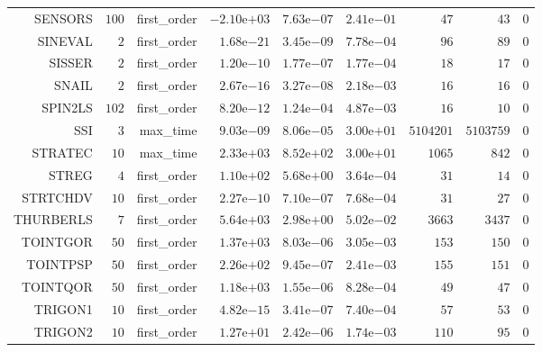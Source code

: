 \begin{longtable}{rrrrrrrrr}
SENSORS & \(   100\) & first\_order & \(-2.10\)e\(+03\) & \( 7.63\)e\(-07\) & \( 2.41\)e\(-01\) & \(    47\) & \(    43\) & \(     0\) \\
SINEVAL & \(     2\) & first\_order & \( 1.68\)e\(-21\) & \( 3.45\)e\(-09\) & \( 7.78\)e\(-04\) & \(    96\) & \(    89\) & \(     0\) \\
SISSER & \(     2\) & first\_order & \( 1.20\)e\(-10\) & \( 1.77\)e\(-07\) & \( 1.77\)e\(-04\) & \(    18\) & \(    17\) & \(     0\) \\
SNAIL & \(     2\) & first\_order & \( 2.67\)e\(-16\) & \( 3.27\)e\(-08\) & \( 2.18\)e\(-03\) & \(    16\) & \(    16\) & \(     0\) \\
SPIN2LS & \(   102\) & first\_order & \( 8.20\)e\(-12\) & \( 1.24\)e\(-04\) & \( 4.87\)e\(-03\) & \(    16\) & \(    10\) & \(     0\) \\
SSI & \(     3\) & max\_time & \( 9.03\)e\(-09\) & \( 8.06\)e\(-05\) & \( 3.00\)e\(+01\) & \(5104201\) & \(5103759\) & \(     0\) \\
STRATEC & \(    10\) & max\_time & \( 2.33\)e\(+03\) & \( 8.52\)e\(+02\) & \( 3.00\)e\(+01\) & \(  1065\) & \(   842\) & \(     0\) \\
STREG & \(     4\) & first\_order & \( 1.10\)e\(+02\) & \( 5.68\)e\(+00\) & \( 3.64\)e\(-04\) & \(    31\) & \(    14\) & \(     0\) \\
STRTCHDV & \(    10\) & first\_order & \( 2.27\)e\(-10\) & \( 7.10\)e\(-07\) & \( 7.68\)e\(-04\) & \(    31\) & \(    27\) & \(     0\) \\
THURBERLS & \(     7\) & first\_order & \( 5.64\)e\(+03\) & \( 2.98\)e\(+00\) & \( 5.02\)e\(-02\) & \(  3663\) & \(  3437\) & \(     0\) \\
TOINTGOR & \(    50\) & first\_order & \( 1.37\)e\(+03\) & \( 8.03\)e\(-06\) & \( 3.05\)e\(-03\) & \(   153\) & \(   150\) & \(     0\) \\
TOINTPSP & \(    50\) & first\_order & \( 2.26\)e\(+02\) & \( 9.45\)e\(-07\) & \( 2.41\)e\(-03\) & \(   155\) & \(   151\) & \(     0\) \\
TOINTQOR & \(    50\) & first\_order & \( 1.18\)e\(+03\) & \( 1.55\)e\(-06\) & \( 8.28\)e\(-04\) & \(    49\) & \(    47\) & \(     0\) \\
TRIGON1 & \(    10\) & first\_order & \( 4.82\)e\(-15\) & \( 3.41\)e\(-07\) & \( 7.40\)e\(-04\) & \(    57\) & \(    53\) & \(     0\) \\
TRIGON2 & \(    10\) & first\_order & \( 1.27\)e\(+01\) & \( 2.42\)e\(-06\) & \( 1.74\)e\(-03\) & \(   110\) & \(    95\) & \(     0\) \\

\end{longtable}

